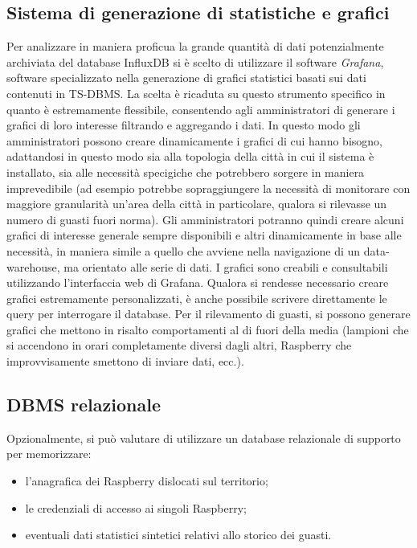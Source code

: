 \subsection{Sistema di generazione di statistiche e grafici}
Per analizzare in maniera proficua la grande quantità di dati potenzialmente archiviata del database InfluxDB si è scelto di utilizzare il software \textit{Grafana}, software specializzato nella generazione di grafici statistici basati sui dati contenuti in TS-DBMS.
La scelta è ricaduta su questo strumento specifico in quanto è estremamente flessibile, consentendo agli amministratori di generare i grafici di loro interesse filtrando e aggregando i dati.
In questo modo gli amministratori possono creare dinamicamente i grafici di cui hanno bisogno, adattandosi in questo modo sia alla topologia della città in cui il sistema è installato, sia alle necessità specigiche che potrebbero sorgere in maniera imprevedibile (ad esempio potrebbe sopraggiungere la necessità di monitorare con maggiore granularità un'area della città in particolare, qualora si rilevasse un numero di guasti fuori norma).
Gli amministratori potranno quindi creare alcuni grafici di interesse generale sempre disponibili e altri dinamicamente in base alle necessità, in maniera simile a quello che avviene nella navigazione di un data-warehouse, ma orientato alle serie di dati.
I grafici sono creabili e consultabili utilizzando l'interfaccia web di Grafana. Qualora si rendesse necessario creare grafici estremamente personalizzati, è anche possibile scrivere direttamente le query per interrogare il database.
Per il rilevamento di guasti, si possono generare grafici che mettono in risalto comportamenti al di fuori della media (lampioni che si accendono in orari completamente diversi dagli altri, Raspberry che improvvisamente smettono di inviare dati, ecc.).

\subsection{DBMS relazionale}
Opzionalmente, si può valutare di utilizzare un database relazionale di supporto per memorizzare:
\begin{itemize}
 \item l'anagrafica dei Raspberry dislocati sul territorio;
 \item le credenziali di accesso ai singoli Raspberry;
 \item eventuali dati statistici sintetici relativi allo storico dei guasti.
\end{itemize}


